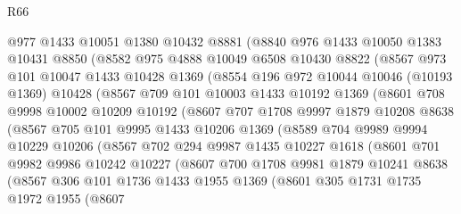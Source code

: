 \begin{lexlean}{R66}
\begin{coremodule}
      @977
      @1433
      @10051
      @1380
      @10432
      @8881
      (@8840
        @976
        @1433
        @10050
        @1383
        @10431
        @8850
        (@8582
          @975
          @4888
          @10049
          @6508
          @10430
          @8822
          (@8567
            @973
            @101
            @10047
            @1433
            @10428
            @1369
            (@8554
              @196
              @972
              @10044
              @10046
              (@10193 @1369)
              @10428
              (@8567
                @709
                @101
                @10003
                @1433
                @10192
                @1369
                (@8601
                  @708
                  @9998
                  @10002
                  @10209
                  @10192
                  (@8607
                    @707
                    @1708
                    @9997
                    @1879
                    @10208
                    @8638
                    (@8567
                      @705
                      @101
                      @9995
                      @1433
                      @10206
                      @1369
                      (@8589
                        @704
                        @9989
                        @9994
                        @10229
                        @10206
                        (@8567
                          @702
                          @294
                          @9987
                          @1435
                          @10227
                          @1618
                          (@8601
                            @701
                            @9982
                            @9986
                            @10242
                            @10227
                            (@8607
                              @700
                              @1708
                              @9981
                              @1879
                              @10241
                              @8638
                              (@8567
                                @306
                                @101
                                @1736
                                @1433
                                @1955
                                @1369
                                (@8601
                                  @305
                                  @1731
                                  @1735
                                  @1972
                                  @1955
                                  (@8607

\end{coremodule}
\end{lexlean}
